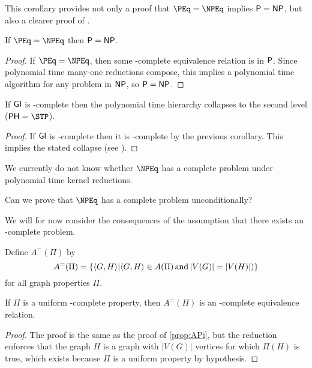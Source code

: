 This corollary provides not only a proof that $\PEq=\NPEq$ implies $\P=\NP$, but also a clearer proof of \cite[Proposition~8.1]{bcffm}.

\begin{corollary}
  If $\PEq=\NPEq$ then $\P=\NP$.
\end{corollary}
\begin{proof}
  If $\PEq=\NPEq$, then some \NP-complete equivalence relation is in $\P$.
  Since polynomial time many-one reductions compose, this implies a polynomial time algorithm for any problem in $\NP$, so $\P=\NP$.
\end{proof}

\begin{proposition}
  If $\GI$ is \NPEq-complete then the polynomial time hierarchy collapses to the second level ($\PH=\STP$).
\end{proposition}
\begin{proof}
  If $\GI$ is \NPEq-complete then it is \NP-complete by the previous corollary.
  This implies the stated collapse (see \cite{schoning87}).
\end{proof}

We currently do not know whether $\NPEq$ has a complete problem under polynomial time kernel reductions.
\begin{openproblem}
  Can we prove that $\NPEq$ has a complete problem unconditionally?
\end{openproblem}

We will for now consider the consequences of the assumption that there exists an \NPEq-complete problem.

Define $A^=(\Pi)$ by
\begin{displaymath}
  A^=(\Pi) = \{\pair{G}{H} | \pair{G}{H}\in A(\Pi) \plain{and} |V(G)|=|V(H)|)\}
\end{displaymath}
for all graph properties $\Pi$.

\begin{proposition}\label{prop:APieq}
  If $\Pi$ is a uniform \NP-complete property, then $A^=(\Pi)$ is an \NP-complete equivalence relation.
\end{proposition}
\begin{proof}
  The proof is the same as the proof of \autoref{prop:APi}, but the reduction enforces that the graph $H$ is a graph with $|V(G)|$ vertices for which $\Pi(H)$ is true, which exists because $\Pi$ is a uniform property by hypothesis.
\end{proof}

